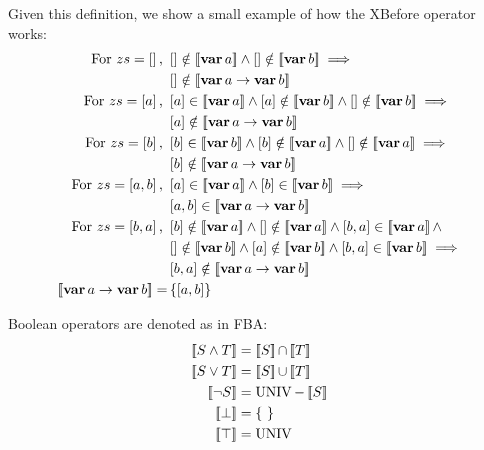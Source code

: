 Given this definition, we show a small example of how the \ac{XBefore} operator works:
%
\begin{align}
\text{For } zs = \listsin{} \text{, } &
  \listsin{} \notin \denote{\var{a}} \land 
  \listsin{} \notin \denote{\var{b}} 
  \implies\nonumber\\
  & \listsin{} \notin \denote{\xbefore{\var{a}}{\var{b}}} \nonumber\\
\text{For } zs = \listsin{a} \text{, } &
  \listsin{a} \in \denote{\var{a}} \land 
  \listsin{a} \notin \denote{\var{b}} \land 
  \listsin{} \notin \denote{\var{b}} 
  \implies\nonumber\\
  & \listsin{a} \notin \denote{\xbefore{\var{a}}{\var{b}}} \nonumber\\
\text{For } zs = \listsin{b} \text{, } &
  \listsin{b} \in \denote{\var{b}} \land
  \listsin{b} \notin \denote{\var{a}} \land 
  \listsin{} \notin \denote{\var{a}} 
  \implies\nonumber\\
  & \listsin{b} \notin \denote{\xbefore{\var{a}}{\var{b}}} \nonumber\\
\text{For } zs = \listsin{a,b} \text{, } &
  \listsin{a} \in \denote{\var{a}} \land 
  \listsin{b} \in \denote{\var{b}} 
  \implies\nonumber\\
  & \listsin{a,b} \in \denote{\xbefore{\var{a}}{\var{b}}} \nonumber\\
\text{For } zs = \listsin{b,a} \text{, } &
  \listsin{b} \notin \denote{\var{a}} \land 
  \listsin{} \notin \denote{\var{a}} \land 
  \listsin{b,a} \in \denote{\var{a}} \land\nonumber\\
  & \listsin{} \notin \denote{\var{b}} \land 
  \listsin{a} \notin \denote{\var{b}} \land
  \listsin{b,a} \in \denote{\var{b}}
  \implies\nonumber\\
  & \listsin{b,a} \notin \denote{\xbefore{\var{a}}{\var{b}}} \nonumber\\
\denote{\xbefore{\var{a}}{\var{b}}} = & \left\{\listsin{a,b}\right\}
\end{align}

Boolean operators are denoted as in \ac{FBA}:
\begin{subequations}
\begin{align}
\denote{S \land T} & = \denote{S} \inter \denote{T}\label{eq:denotational-inf}\\
\denote{S \lor T} & = \denote{S} \union \denote{T}\label{eq:denotational-sup}\\
\denote{\lnot S} & = \UNIV - \denote{S} \label{eq:denotational-complement}\\
\denote{\bot} &= \emptyset\label{eq:denotational-bot}\\
\denote{\top} &= \UNIV\label{eq:denotational-top}
\end{align}
\end{subequations}

